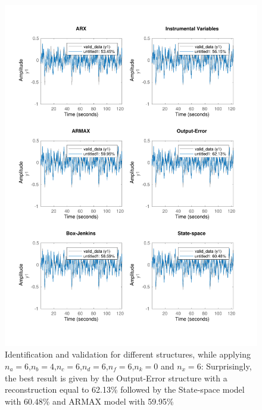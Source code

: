 \documentclass[a4paper,11pt]{article}
\begin{document}
\begin{figure}[H]
\centering
\includegraphics[width=\textwidth]{images/4_time_domain_valid}
\caption{Identification and validation for different structures, while applying $n_a = 6$,$n_b = 4$,$n_c = 6$,$n_d = 6$,$n_f = 6$,$n_k = 0$ and $n_x = 6$: Surprisingly, the best result is given by the Output-Error structure with a reconstruction equal to 62.13\% followed by the State-space model with 60.48\% and ARMAX model with 59.95\%}
\label{fig:sys_compare}
\end{figure}
\end{document}
